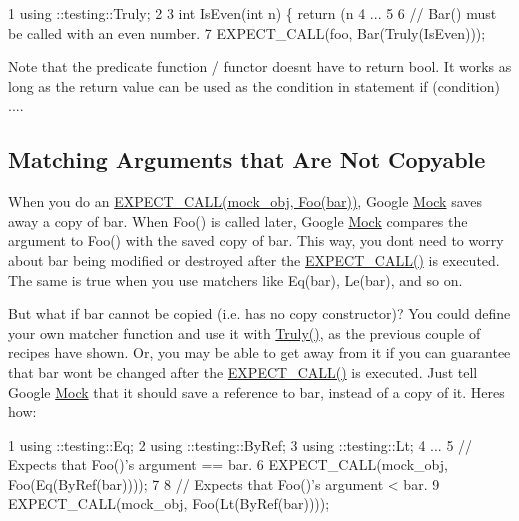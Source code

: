 \begin{DoxyCode}
1 using ::testing::Truly;
2 
3 int IsEven(int n) \{ return (n %
4 ...
5 
6   // Bar() must be called with an even number.
7   EXPECT\_CALL(foo, Bar(Truly(IsEven)));
\end{DoxyCode}


Note that the predicate function / functor doesn\textquotesingle{}t have to return {\ttfamily bool}. It works as long as the return value can be used as the condition in statement {\ttfamily if (condition) ...}.

\subsection*{Matching Arguments that Are Not Copyable}

When you do an {\ttfamily \hyperlink{gmock-spec-builders_8h_a535a6156de72c1a2e25a127e38ee5232}{E\+X\+P\+E\+C\+T\+\_\+\+C\+A\+L\+L(mock\+\_\+obj, Foo(bar))}}, Google \hyperlink{classMock}{Mock} saves away a copy of {\ttfamily bar}. When {\ttfamily Foo()} is called later, Google \hyperlink{classMock}{Mock} compares the argument to {\ttfamily Foo()} with the saved copy of {\ttfamily bar}. This way, you don\textquotesingle{}t need to worry about {\ttfamily bar} being modified or destroyed after the {\ttfamily \hyperlink{gmock-spec-builders_8h_a535a6156de72c1a2e25a127e38ee5232}{E\+X\+P\+E\+C\+T\+\_\+\+C\+A\+L\+L()}} is executed. The same is true when you use matchers like {\ttfamily Eq(bar)}, {\ttfamily Le(bar)}, and so on.

But what if {\ttfamily bar} cannot be copied (i.\+e. has no copy constructor)? You could define your own matcher function and use it with {\ttfamily \hyperlink{namespacetesting_a5faf05cfaae6074439960048e478b1c8}{Truly()}}, as the previous couple of recipes have shown. Or, you may be able to get away from it if you can guarantee that {\ttfamily bar} won\textquotesingle{}t be changed after the {\ttfamily \hyperlink{gmock-spec-builders_8h_a535a6156de72c1a2e25a127e38ee5232}{E\+X\+P\+E\+C\+T\+\_\+\+C\+A\+L\+L()}} is executed. Just tell Google \hyperlink{classMock}{Mock} that it should save a reference to {\ttfamily bar}, instead of a copy of it. Here\textquotesingle{}s how\+:


\begin{DoxyCode}
1 using ::testing::Eq;
2 using ::testing::ByRef;
3 using ::testing::Lt;
4 ...
5   // Expects that Foo()'s argument == bar.
6   EXPECT\_CALL(mock\_obj, Foo(Eq(ByRef(bar))));
7 
8   // Expects that Foo()'s argument < bar.
9   EXPECT\_CALL(mock\_obj, Foo(Lt(ByRef(bar))));
\end{DoxyCode}


